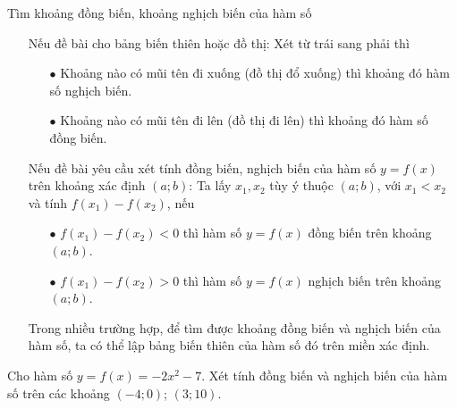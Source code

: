 \begin{dang}{Tìm khoảng đồng biến, khoảng nghịch biến của hàm số}
\begin{itemize}
	\item[\faPencilSquareO] Nếu đề bài cho bảng biến thiên hoặc đồ thị: Xét từ trái sang phải thì
	\begin{itemize}
		\item [$\bullet$] Khoảng nào có mũi tên đi xuống (đồ thị đổ xuống) thì khoảng đó hàm số nghịch biến.
		\item [$\bullet$] Khoảng nào có mũi tên đi lên (đồ thị đi lên) thì khoảng đó hàm số đồng biến.
	\end{itemize}
	\item[\faPencilSquareO] Nếu đề bài yêu cầu xét tính đồng biến, nghịch biến của hàm số $y=f(x)$ trên khoảng xác định $(a;b)$:  Ta lấy $x_1, x_2$ tùy ý thuộc $(a;b)$, với $x_1<x_2$ và tính $f(x_1)-f(x_2)$, nếu
	\begin{itemize}
		\item [$\bullet$] $f(x_1)-f(x_2)<0$ thì hàm số $y=f(x)$ đồng biến trên khoảng $(a;b)$.
		\item [$\bullet$] $f(x_1)-f(x_2)>0$ thì hàm số $y=f(x)$ nghịch biến trên khoảng $(a;b)$.
	\end{itemize}
	\item[\faPencilSquareO] Trong nhiều trường hợp, để tìm được khoảng đồng biến và nghịch biến của hàm số, ta có thể lập bảng biến thiên của hàm số đó trên miền xác định.
\end{itemize}
\end{dang}
\begin{vd}
	\loigiai{}
\end{vd}
\begin{vd}
	Cho hàm số $y=f(x)=-2x^2-7$. Xét tính đồng biến và nghịch biến của hàm số trên các khoảng $(-4;0)$; $(3;10)$.
		\loigiai{}
\end{vd}


